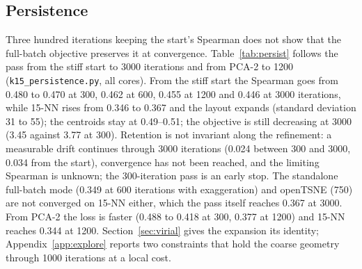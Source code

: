 \documentclass[11pt]{article}
\newcommand{\magnet}{\textsc{magnet}}
\begin{document}
\begin{table}[t]
\centering\small
\caption{Repeated tuned-start comparison (\texttt{staged\_seeds.py}, all cores, 5 runs per cell; 2
for openTSNE; standard deviations of the values before the pass and of the paired changes are in the
JSON): the same pass applied to \magnet{}'s first stage at four stiffnesses, PaCMAP at its
defaults and at the stiff setting of the sweep, UMAP and openTSNE. Before $\to$ after (mean), $\pm$
standard deviation of the value after the pass.}
\label{tab:staged_seeds}
\resizebox{\textwidth}{!}{}
\end{table}

\subsection{Persistence}\label{sec:persist}
Three hundred iterations keeping the start's Spearman does not show that the full-batch objective
preserves it at convergence. Table~\ref{tab:persist} follows the pass from the stiff start to 3000
iterations and from PCA-2 to 1200 (\texttt{k15\_persistence.py}, all cores). From the stiff start the
Spearman goes from 0.480 to 0.470 at 300, 0.462 at 600, 0.455 at 1200 and 0.446 at 3000 iterations,
while 15-NN rises from 0.346 to 0.367 and the layout expands (standard deviation 31 to 55); the
centroids stay at 0.49--0.51; the objective is still decreasing at 3000 (3.45 against 3.77 at 300).
Retention is not invariant along the refinement: a measurable drift continues through 3000 iterations
(0.024 between 300 and 3000, 0.034 from the start), convergence has not been reached, and the limiting
Spearman is unknown; the 300-iteration pass is an early stop. The standalone full-batch mode (0.349 at
600 iterations with exaggeration) and openTSNE (750) are not converged on 15-NN either, which the pass
itself reaches 0.367 at 3000. From PCA-2 the loss is faster (0.488 to 0.418 at 300, 0.377 at 1200) and
15-NN reaches 0.344 at 1200. Section~\ref{sec:virial} gives the expansion its identity;
Appendix~\ref{app:explore} reports two constraints that hold the coarse geometry through 1000
iterations at a local cost.
\end{document}
